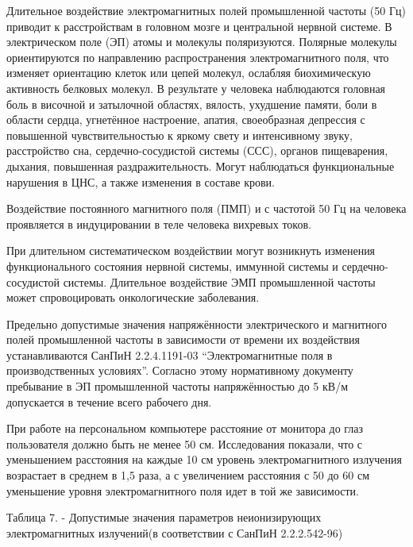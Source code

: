 Длительное воздействие электромагнитных полей промышленной частоты (50 Гц) приводит к расстройствам в головном мозге и центральной нервной системе. В электрическом поле (ЭП) атомы и молекулы поляризуются.
Полярные молекулы ориентируются по направлению распространения электромагнитного поля, что изменяет ориентацию клеток или цепей молекул, ослабляя биохимическую активность белковых молекул.
В результате у человека наблюдаются головная боль в височной и затылочной областях, вялость, ухудшение памяти, боли в области сердца, угнетённое настроение, апатия, своеобразная депрессия с повышенной чувствительностью к яркому свету и интенсивному звуку, расстройство сна, сердечно-сосудистой системы (ССС), органов пищеварения, дыхания, повышенная раздражительность.
Могут наблюдаться функциональные нарушения в ЦНС, а также изменения в составе крови.

Воздействие постоянного магнитного поля (ПМП) и с частотой 50 Гц на человека проявляется в индуцировании в теле человека вихревых токов.

При длительном систематическом воздействии могут возникнуть изменения функционального состояния нервной системы, иммунной системы и сердечно-сосудистой системы. Длительное воздействие ЭМП промышленной частоты может спровоцировать онкологические заболевания.

Предельно допустимые значения напряжённости электрического и магнитного полей промышленной частоты в зависимости от времени их воздействия устанавливаются СанПиН 2.2.4.1191-03 “Электромагнитные поля в производственных условиях”. Согласно этому нормативному документу пребывание в ЭП промышленной частоты напряжённостью до 5 кВ/м допускается в течение всего рабочего дня.

При работе на персональном компьютере расстояние от монитора до глаз пользователя должно быть не менее 50 см. Исследования показали, что с уменьшением расстояния на каждые 10 см уровень электромагнитного излучения возрастает в среднем в 1,5 раза, а с увеличением расстояния с 50 до 60 см уменьшение уровня электромагнитного поля идет в той же зависимости.

Таблица 7.  - Допустимые значения параметров неионизирующих электромагнитных излучений(в соответствии с СанПиН 2.2.2.542-96)

